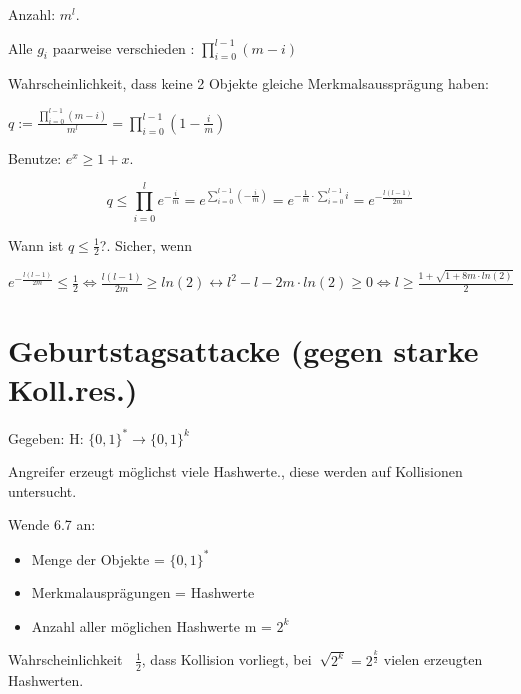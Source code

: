   Anzahl: $m^l$.

  Alle $g_i$ paarweise verschieden : $\prod_{i=0}^{l-1} (m-i)$

  \par \medskip

  Wahrscheinlichkeit, dass keine 2 Objekte gleiche Merkmalsaussprägung haben:

  \begin{center}
    $q := \frac{\prod_{i=0}^{l-1} (m-i)}{m^l} = \prod_{i=0}^{l-1} (1- \frac{i}{m})$
  \end{center}

  Benutze: $e^x \ge 1+x$.

  \begin{equation*}
    q \le \prod_{i=0}^l e^{- \frac{i}{m}} = e^{\sum_{i=0}^{l-1} (- \frac{i}{m})} = e^{- \frac{1}{m} \cdot \sum_{i=0}^{l-1} i} = e^{- \frac{l(l-1)}{2m}}
  \end{equation*}

  Wann ist $q \le \frac{1}{2}$?. Sicher, wenn

  $e^{- \frac{l(l-1)}{2m}} \le \frac{1}{2} \Leftrightarrow \frac{l(l-1)}{2m} \ge ln(2) \leftrightarrow l^2 - l - 2m \cdot ln(2) \ge 0 \Leftrightarrow l \ge \frac{1 + \sqrt{1+8m \cdot ln(2)}}{2}$

  \section{Geburtstagsattacke (gegen starke Koll.res.)}

  Gegeben: H: $\{0,1\}^* \rightarrow \{0,1\}^k$

  Angreifer erzeugt möglichst viele Hashwerte., diese werden auf Kollisionen untersucht. 

  Wende 6.7 an: 

  \begin{itemize}
    \item Menge der Objekte = $\{0,1\}^*$
    \item Merkmalausprägungen = Hashwerte
    \item Anzahl aller möglichen Hashwerte m = $2^k$
  \end{itemize}

  Wahrscheinlichkeit $~$ $\frac{1}{2}$, dass Kollision vorliegt, bei $~ \sqrt{2^k} = 2^{\frac{k}{2}}$ vielen erzeugten Hashwerten.

  \par \medskip

  \par \medskip

